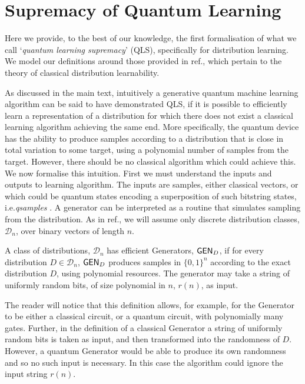 \section{Supremacy of Quantum Learning}
\label{supp_mat:superioritydefinitions}

Here we provide, to the best of our knowledge, the first formalisation of what we call `\textit{quantum learning supremacy}' (QLS), specifically for distribution learning. We model our definitions around those provided in ref., which pertain to the theory of classical distribution learnability. 

As discussed in the main text, intuitively a generative quantum machine learning algorithm can be said to have demonstrated QLS, if it is possible to efficiently learn a representation of a distribution for which there does not exist a classical learning algorithm achieving the same end. More specifically, the quantum device has the ability to produce samples according to a distribution that is close in total variation to some target, using a polynomial number of samples from the target. However, there should be no classical algorithm which could achieve this. 
We now formalise this intuition. First we must understand the inputs and outputs to learning algorithm. The inputs are samples, either classical vectors, or which could be quantum states encoding a superposition of such bitstring states, i.e.\@ \textit{qsamples} . A generator can be interpreted as a routine that simulates sampling from the distribution. As in ref., we will assume only discrete distribution classes, $\mathcal{D}_n$, over binary vectors of length $n$.%

\begin{definition}\label{defn:generator_supp}
    A class of distributions, $\mathcal{D}_n$ has efficient Generators, $\operatorname{\textsf{GEN}}_{D}$, if for every distribution $D \in \mathcal{D}_n$, $\operatorname{\textsf{GEN}}_{D}$ produces samples in $\{0, 1\}^n$ according to the exact distribution $D$, using polynomial resources.
    The generator may take a string of uniformly random bits, of size polynomial in $n$, $r(n)$, as input.
\end{definition}

The reader will notice that this definition allows, for example, for the Generator to be either a classical circuit, or a quantum circuit, with polynomially many gates. Further, in the definition of a classical Generator  a string of uniformly random bits is taken as input, and then transformed into the randomness of $D$. However, a quantum Generator would be able to produce its own randomness and so no such input is necessary. In this case the algorithm could ignore the input string $r(n)$. 

